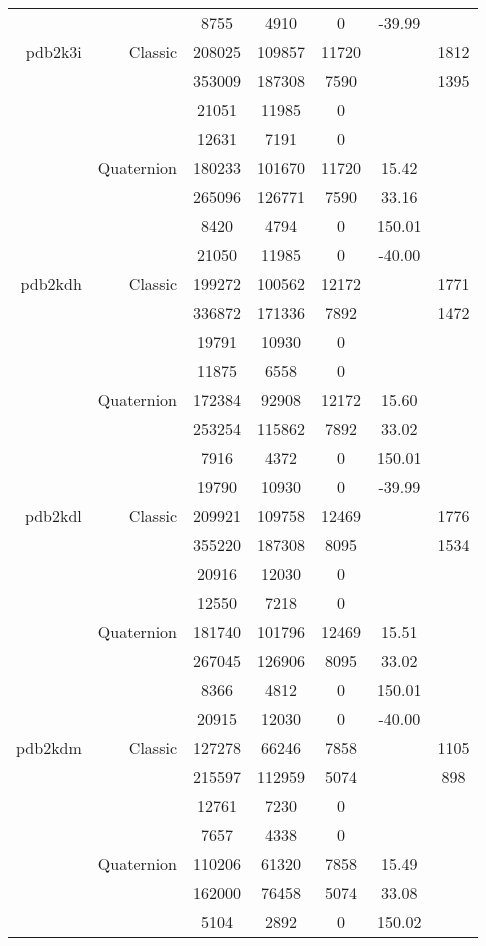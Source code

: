 \begin{xltabular}{\textwidth}{r|rcccSc}
& & 8755 & 4910 & 0 & -39.99 & \\ \addlinespace
pdb2k3i & Classic & 208025 & 109857 & 11720 & & 1812 \\
& & 353009 & 187308 & 7590 & & 1395 \\
& & 21051 & 11985 & 0 & & \\
& & 12631 & 7191 & 0 & & \\
& Quaternion & 180233 & 101670 & 11720 & 15.42 & \\
& & 265096 & 126771 & 7590 & 33.16 & \\
& & 8420 & 4794 & 0 & 150.01 & \\
& & 21050 & 11985 & 0 & -40.00 & \\ \addlinespace
pdb2kdh & Classic & 199272 & 100562 & 12172 & & 1771 \\
& & 336872 & 171336 & 7892 & & 1472 \\
& & 19791 & 10930 & 0 & & \\
& & 11875 & 6558 & 0 & & \\
& Quaternion & 172384 & 92908 & 12172 & 15.60 & \\
& & 253254 & 115862 & 7892 & 33.02 & \\
& & 7916 & 4372 & 0 & 150.01 & \\
& & 19790 & 10930 & 0 & -39.99 & \\ \addlinespace
pdb2kdl & Classic & 209921 & 109758 & 12469 & & 1776 \\
& & 355220 & 187308 & 8095 & & 1534 \\
& & 20916 & 12030 & 0 & & \\
& & 12550 & 7218 & 0 & & \\
& Quaternion & 181740 & 101796 & 12469 & 15.51 & \\
& & 267045 & 126906 & 8095 & 33.02 & \\
& & 8366 & 4812 & 0 & 150.01 & \\
& & 20915 & 12030 & 0 & -40.00 & \\ \addlinespace
pdb2kdm & Classic & 127278 & 66246 & 7858 & & 1105 \\
& & 215597 & 112959 & 5074 & & 898 \\
& & 12761 & 7230 & 0 & & \\
& & 7657 & 4338 & 0 & & \\
& Quaternion & 110206 & 61320 & 7858 & 15.49 & \\
& & 162000 & 76458 & 5074 & 33.08 & \\
& & 5104 & 2892 & 0 & 150.02 & \\

\end{xltabular}
